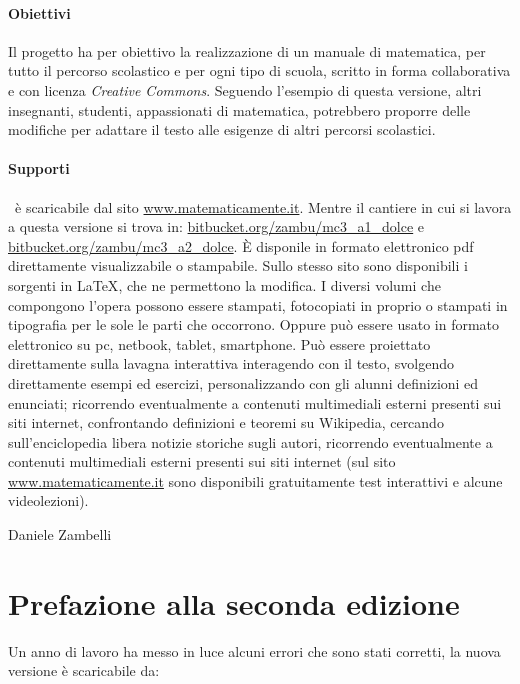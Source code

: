 \paragraph{Obiettivi} Il progetto \emph{\serie} ha per obiettivo la 
realizzazione di un manuale di matematica, per tutto il percorso scolastico 
e per ogni tipo di scuola, scritto in forma collaborativa e con licenza 
\textit{Creative Commons}. 
Seguendo l'esempio di questa versione, altri insegnanti, studenti, 
appassionati di matematica, potrebbero proporre delle modifiche per adattare 
il testo alle esigenze di altri percorsi scolastici.

\paragraph{Supporti}
\serie\ è scaricabile dal sito \url{www.matematicamente.it}. 
Mentre il cantiere in cui si lavora a questa versione si trova in:
\url{bitbucket.org/zambu/mc3_a1_dolce} e 
\url{bitbucket.org/zambu/mc3_a2_dolce}. 
È disponile in formato elettronico pdf direttamente visualizzabile o 
stampabile. 
Sullo stesso sito sono disponibili i sorgenti in {\LaTeX}, 
che ne permettono la modifica. 
I diversi volumi che compongono l'opera possono essere stampati, 
fotocopiati in proprio o stampati in tipografia per le sole le parti che 
occorrono. 
Oppure può essere usato in formato elettronico su pc, netbook, tablet, 
smartphone.
Può essere proiettato direttamente sulla lavagna interattiva 
interagendo con il testo, svolgendo direttamente esempi ed esercizi, 
personalizzando con gli alunni definizioni ed enunciati; 
ricorrendo eventualmente a contenuti multimediali esterni presenti 
sui siti internet, confrontando definizioni e teoremi su Wikipedia, 
cercando sull'enciclopedia libera notizie storiche sugli autori, 
ricorrendo eventualmente a contenuti multimediali esterni presenti sui siti 
internet (sul sito \url{www.matematicamente.it} sono disponibili 
gratuitamente test interattivi e alcune videolezioni). 

\begin{flushright}
Daniele Zambelli
\end{flushright}

\newpage

\section{Prefazione alla seconda edizione}

Un anno di lavoro ha messo in luce alcuni errori che sono stati corretti,
la nuova versione è scaricabile da:


